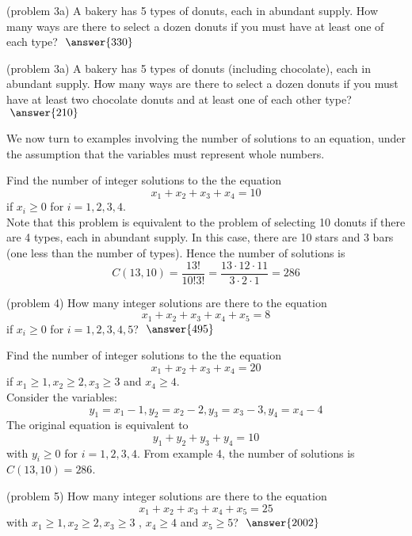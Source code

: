 \documentclass[handout]{ximera}
\begin{document}
\begin{problem}(problem 3a)
A bakery has 5 types of donuts, each in abundant supply. How many ways are there to select a dozen donuts if you must have at least one of each type? $\; \answer{330}$
\end{problem}

\begin{problem}(problem 3a)
A bakery has 5 types of donuts (including chocolate), each in abundant supply. How many ways are there to select a dozen donuts if you must have at least two chocolate donuts and at least one of each other type? $\; \answer{210}$
\end{problem}

We now turn to examples involving the number of solutions to an equation, under the assumption that 
the variables must represent whole numbers.

\begin{example}[example 4]
Find the number of integer solutions to the the equation
\[
x_1 + x_2 + x_3 + x_4 = 10
\]
if $x_i \geq 0$ for $i = 1, 2, 3, 4$.\\
Note that this problem is equivalent to the problem of selecting 10 donuts if there are 4 types, each in abundant supply. In this case, there are 10 stars and 3 bars (one less than the number of types).  Hence the number of solutions is 
\[
C(13, 10) = \frac{13!}{10! 3!} = \frac{13 \cdot 12 \cdot 11}{3 \cdot 2 \cdot 1} = 286
\]
\end{example}

\begin{problem}(problem 4)
How many integer solutions are there to the equation
\[
x_1 + x_2 + x_3 + x_4 +x_5 = 8
\]
if $x_i \geq 0$  for $i = 1, 2, 3, 4, 5$? $\; \answer{495}$
\end{problem}


\begin{example}[example 5]
Find the number of integer solutions to the the equation
\[
x_1 + x_2 + x_3 + x_4 = 20
\]
if $x_1 \geq 1, x_2 \geq 2, x_3 \geq 3$ and $x_4 \geq 4$.\\
Consider the variables:
\[
y_1 = x_1 -1, y_2 = x_2 -2, y_3 = x_3 -3, y_4 = x_4 -4
\]
The original equation is equivalent to
\[
y_1 + y_2 + y_3 + y_4 = 10
\]
with $y_i \geq 0$ for $i = 1, 2, 3, 4$. From example 4, the number of solutions is $C(13,10) = 286$.
\end{example}


\begin{problem}(problem 5)
How many integer solutions are there to the equation
\[
x_1 + x_2 + x_3 + x_4 +x_5 = 25
\]
with $x_1 \geq 1, x_2 \geq 2, x_3 \geq 3$ , $x_4 \geq 4$ and $x_5 \geq 5$? $\; \answer{2002}$

\end{problem}
\end{document}
